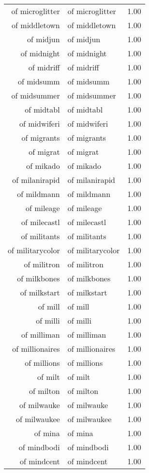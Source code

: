 \begin{table}[ht]
\begin{tabular}{rlr}
  of microglitter & of microglitter & 1.00 \\ 
  of middletown & of middletown & 1.00 \\ 
  of midjun & of midjun & 1.00 \\ 
  of midnight & of midnight & 1.00 \\ 
  of midriff & of midriff & 1.00 \\ 
  of midsumm & of midsumm & 1.00 \\ 
  of midsummer & of midsummer & 1.00 \\ 
  of midtabl & of midtabl & 1.00 \\ 
  of midwiferi & of midwiferi & 1.00 \\ 
  of migrants & of migrants & 1.00 \\ 
  of migrat & of migrat & 1.00 \\ 
  of mikado & of mikado & 1.00 \\ 
  of milanirapid & of milanirapid & 1.00 \\ 
  of mildmann & of mildmann & 1.00 \\ 
  of mileage & of mileage & 1.00 \\ 
  of milecastl & of milecastl & 1.00 \\ 
  of militants & of militants & 1.00 \\ 
  of militarycolor & of militarycolor & 1.00 \\ 
  of militron & of militron & 1.00 \\ 
  of milkbones & of milkbones & 1.00 \\ 
  of milkstart & of milkstart & 1.00 \\ 
  of mill & of mill & 1.00 \\ 
  of milli & of milli & 1.00 \\ 
  of milliman & of milliman & 1.00 \\ 
  of millionaires & of millionaires & 1.00 \\ 
  of millions & of millions & 1.00 \\ 
  of milt & of milt & 1.00 \\ 
  of milton & of milton & 1.00 \\ 
  of milwauke & of milwauke & 1.00 \\ 
  of milwaukee & of milwaukee & 1.00 \\ 
  of mina & of mina & 1.00 \\ 
  of mindbodi & of mindbodi & 1.00 \\ 
  of mindcent & of mindcent & 1.00 \\ 

\end{tabular}
\end{table}
